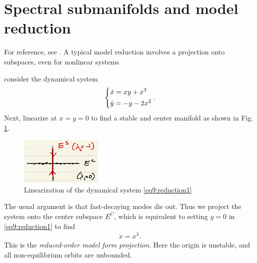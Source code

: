 \section{Spectral submanifolds and model reduction}
For reference, see \cite{Ponsioen2016}. A typical model reduction involves a projection onto subspaces, even for nonlinear systems.

\begin{ex}[]
	consider the dynamical system
	\begin{align}
		\begin{dcases}
			\dot{x} = x y + x^{3} \\
			\dot{y} = -y - 2x^{2}
		\end{dcases}
		.\label{eq9:reduction1}
	\end{align}
	Next, linearize at $x=y=0$ to find a stable and center manifold as shown in Fig. \ref{fig:reduction_linearization1}.
	\begin{figure}[h!]
		\centering
		\includegraphics[width=0.35\textwidth]{figures/ch9/25reduction_linearization1.png}
		\caption{Linearization of the dynamical system \eqref{eq9:reduction1}}
		\label{fig:reduction_linearization1}
	\end{figure}
	The usual argument is that fast-decaying modes die out. Thus we project the system onto the center subspace $E^{C}$, which is equivalent to setting $y=0$ in \eqref{eq9:reduction1} to find
	\begin{align}
		\dot{x} = x^3.
	\end{align}
	This is the \emph{reduced-order model form projection}. Here the origin is unstable, and all non-equilibrium orbits are unbounded.


\end{ex}
